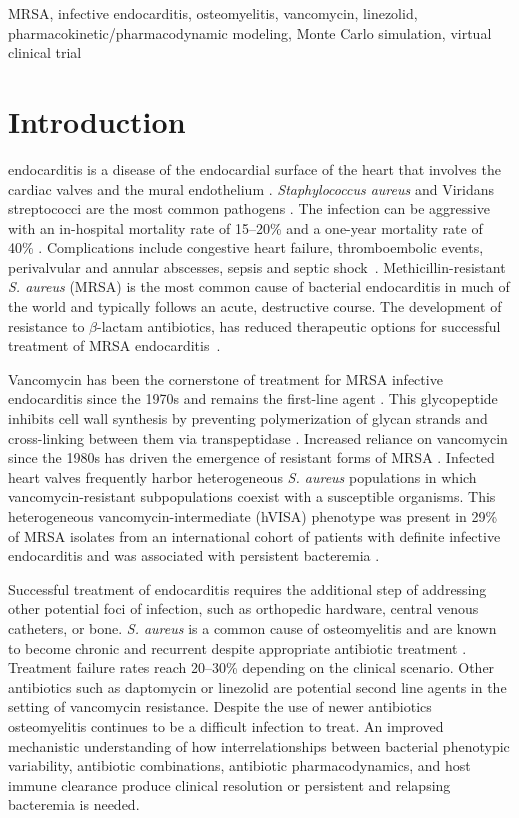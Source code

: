 \documentclass[journal]{IEEEtran}
\begin{document}
\begin{IEEEkeywords}
MRSA, infective endocarditis, osteomyelitis, vancomycin, linezolid, pharmacokinetic/pharmacodynamic modeling, Monte Carlo simulation, virtual clinical trial
\end{IEEEkeywords}

\section{Introduction}
 endocarditis is a disease of the endocardial surface of the heart that
involves the cardiac valves and the mural endothelium \cite{Li2024}. \textit{Staphylococcus aureus} and Viridans streptococci
are the most common pathogens \cite{HammondHaley2023}. The infection can be aggressive
with an in-hospital mortality rate of 15--20\% and a one-year mortality rate of
40\% \cite{Taduru2023}. Complications include congestive heart failure,
thromboembolic events, perivalvular and annular abscesses, sepsis and septic shock~\cite{murdoch2009infective}. Methicillin-resistant
\textit{S. aureus} (MRSA) is the most common cause of bacterial endocarditis in
much of the world and typically follows an acute, destructive course. The development of resistance to $\beta$-lactam antibiotics, has reduced therapeutic options for successful treatment of MRSA endocarditis~\cite{HammondHaley2023}.

Vancomycin has been the cornerstone of treatment for MRSA infective endocarditis
since the 1970s and remains the first-line agent \cite{Minter2023}. This
glycopeptide inhibits cell wall synthesis by preventing polymerization of glycan
strands and cross-linking between them via transpeptidase
\cite{murray_glycopeptides_2019}. Increased reliance on vancomycin since the
1980s has driven the emergence of resistant forms of MRSA
\cite{mcguinness2017vancomycin}.  Infected heart valves frequently harbor heterogeneous \textit{S. aureus}
populations in which vancomycin-resistant subpopulations coexist with a
susceptible organisms. This heterogeneous vancomycin-intermediate (hVISA)
phenotype was present in 29\% of MRSA isolates from an international cohort of
patients with definite infective endocarditis and was associated with persistent
bacteremia \cite{Bae2009}.

Successful treatment of endocarditis requires the additional step of addressing
other potential foci of infection, such as orthopedic hardware, central venous
catheters, or bone.  \textit{S. aureus} is a common cause of osteomyelitis and are known to become chronic and recurrent despite appropriate antibiotic treatment \cite{Kahl2016SCV}. Treatment
failure rates reach 20--30\% depending on the clinical scenario. Other antibiotics such as daptomycin or linezolid are potential second line agents in the setting of vancomycin resistance.  Despite the use of newer antibiotics osteomyelitis continues to be a difficult infection to treat. An improved mechanistic understanding of how interrelationships between bacterial phenotypic variability, antibiotic combinations, antibiotic pharmacodynamics, and host immune clearance produce clinical
resolution or persistent and relapsing bacteremia is needed.
\end{document}
